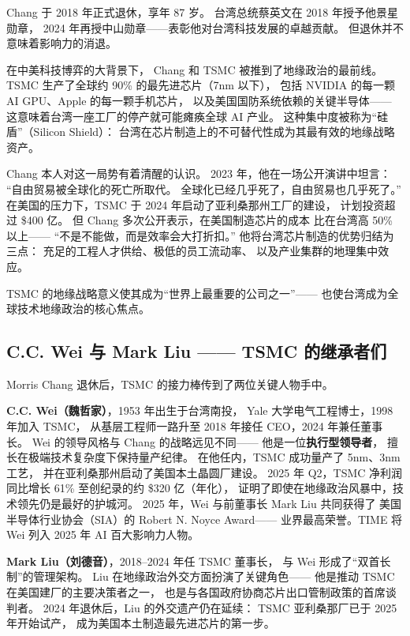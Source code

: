 Chang 于 2018 年正式退休，享年 87 岁。
台湾总统蔡英文在 2018 年授予他景星勋章，
2024 年再授中山勋章——表彰他对台湾科技发展的卓越贡献。
但退休并不意味着影响力的消退。

\begin{whybox}
在中美科技博弈的大背景下，
Chang 和 TSMC 被推到了地缘政治的最前线。
TSMC 生产了全球约 90\% 的最先进芯片（7nm 以下），
包括 NVIDIA 的每一颗 AI GPU、Apple 的每一颗手机芯片，
以及美国国防系统依赖的关键半导体——
这意味着台湾一座工厂的停产就可能瘫痪全球 AI 产业。
这种集中度被称为``硅盾''（Silicon Shield）：
台湾在芯片制造上的不可替代性成为其最有效的地缘战略资产。

Chang 本人对这一局势有着清醒的认识。
2023 年，他在一场公开演讲中坦言：
``自由贸易被全球化的死亡所取代。
全球化已经几乎死了，自由贸易也几乎死了。''
在美国的压力下，TSMC 于 2024 年启动了亚利桑那州工厂的建设，
计划投资超过 \$400 亿。
但 Chang 多次公开表示，在美国制造芯片的成本
比在台湾高 50\% 以上——
``不是不能做，而是效率会大打折扣。''
他将台湾芯片制造的优势归结为三点：
充足的工程人才供给、极低的员工流动率、
以及产业集群的地理集中效应。
\end{whybox}

TSMC 的地缘战略意义使其成为``世界上最重要的公司之一''——
也使台湾成为全球技术地缘政治的核心焦点。

\subsection{C.C. Wei 与 Mark Liu —— TSMC 的继承者们}
\label{subsec:tsmc-successors}

Morris Chang 退休后，TSMC 的接力棒传到了两位关键人物手中。

\textbf{C.C. Wei（魏哲家）}，1953 年出生于台湾南投，
Yale 大学电气工程博士，1998 年加入 TSMC，
从基层工程师一路升至 2018 年接任 CEO，2024 年兼任董事长。
Wei 的领导风格与 Chang 的战略远见不同——
他是一位\textbf{执行型领导者}，
擅长在极端技术复杂度下保持量产纪律。
在他任内，TSMC 成功量产了 5nm、3nm 工艺，
并在亚利桑那州启动了美国本土晶圆厂建设。
2025 年 Q2，TSMC 净利润同比增长 61\% 至创纪录的约 \$320 亿（年化），
证明了即使在地缘政治风暴中，技术领先仍是最好的护城河。
2025 年，Wei 与前董事长 Mark Liu 共同获得了
美国半导体行业协会（SIA）的 Robert N. Noyce Award——
业界最高荣誉。TIME 将 Wei 列入 2025 年 AI 百大影响力人物。

\textbf{Mark Liu（刘德音）}，2018--2024 年任 TSMC 董事长，
与 Wei 形成了``双首长制''的管理架构。
Liu 在地缘政治外交方面扮演了关键角色——
他是推动 TSMC 在美国建厂的主要决策者之一，
也是与各国政府协商芯片出口管制政策的首席谈判者。
2024 年退休后，Liu 的外交遗产仍在延续：
TSMC 亚利桑那厂已于 2025 年开始试产，
成为美国本土制造最先进芯片的第一步。

